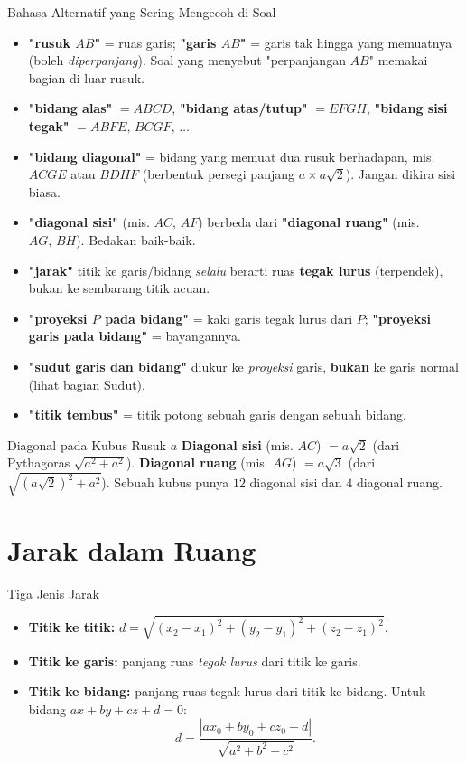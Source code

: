 \documentclass[11pt,a4paper]{report}
\theoremstyle{gaya}
\begin{document}
\begin{konsep}{Bahasa Alternatif yang Sering Mengecoh di Soal}
\begin{itemize}[leftmargin=*,topsep=2pt]
  \item \textbf{"rusuk $AB$"} = ruas garis; \textbf{"garis $AB$"} = garis tak hingga yang memuatnya (boleh \emph{diperpanjang}). Soal yang menyebut "perpanjangan $AB$" memakai bagian di luar rusuk.
  \item \textbf{"bidang alas"} $=ABCD$, \textbf{"bidang atas/tutup"} $=EFGH$, \textbf{"bidang sisi tegak"} $=ABFE,\,BCGF,\,\dots$
  \item \textbf{"bidang diagonal"} = bidang yang memuat dua rusuk berhadapan, mis. $ACGE$ atau $BDHF$ (berbentuk persegi panjang $a\times a\sqrt2$). Jangan dikira sisi biasa.
  \item \textbf{"diagonal sisi"} (mis. $AC,\,AF$) berbeda dari \textbf{"diagonal ruang"} (mis. $AG,\,BH$). Bedakan baik-baik.
  \item \textbf{"jarak"} titik ke garis/bidang \emph{selalu} berarti ruas \textbf{tegak lurus} (terpendek), bukan ke sembarang titik acuan.
  \item \textbf{"proyeksi $P$ pada bidang"} = kaki garis tegak lurus dari $P$; \textbf{"proyeksi garis pada bidang"} = bayangannya.
  \item \textbf{"sudut garis dan bidang"} diukur ke \emph{proyeksi} garis, \textbf{bukan} ke garis normal (lihat bagian Sudut).
  \item \textbf{"titik tembus"} = titik potong sebuah garis dengan sebuah bidang.
\end{itemize}
\end{konsep}

\begin{konsep}{Diagonal pada Kubus Rusuk $a$}
\textbf{Diagonal sisi} (mis. $AC$) $=a\sqrt2$ (dari Pythagoras $\sqrt{a^2+a^2}$). \textbf{Diagonal ruang} (mis. $AG$) $=a\sqrt3$ (dari $\sqrt{(a\sqrt2)^2+a^2}$). Sebuah kubus punya $12$ diagonal sisi dan $4$ diagonal ruang.
\end{konsep}

\section{Jarak dalam Ruang}
\begin{konsep}{Tiga Jenis Jarak}
\begin{itemize}[leftmargin=*,topsep=2pt]
  \item \textbf{Titik ke titik:} $d=\sqrt{(x_2-x_1)^2+(y_2-y_1)^2+(z_2-z_1)^2}$.
  \item \textbf{Titik ke garis:} panjang ruas \emph{tegak lurus} dari titik ke garis.
  \item \textbf{Titik ke bidang:} panjang ruas tegak lurus dari titik ke bidang. Untuk bidang $ax+by+cz+d=0$:
  \[
  d=\frac{|ax_0+by_0+cz_0+d|}{\sqrt{a^2+b^2+c^2}}.
  \]
\end{itemize}
\end{konsep}
\end{document}
